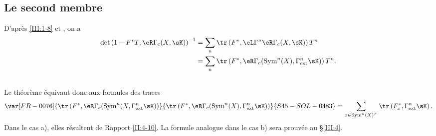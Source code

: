 \subsection{Le second membre}\label{III:2-12}

D'après \ref{III:1-8} et , on a 
\begin{align*}
  \det\left(1-F^* T,\eR\Gamma_c(X,\sK)\right)^{-1} 
    &= \sum_n \tr\left(F^*,\eL\Gamma^n\eR\Gamma_c(X,\sK)\right) T^n \\
    &= \sum_n \tr\left(F^*,\eR\Gamma_c(\operatorname{Sym}^n(X),\Gamma_\text{ext}^n\sK)\right) T^n \text{.}
\end{align*}





\subsection{}\label{III:2-13}

Le théorème équivaut donc aux formules des traces 
\[
  \var[FR-0076]{\tr\left(F^*,\eR\Gamma_c(\operatorname{Sym}^n(X,\Gamma_\text{ext}^n \sK)\right)}{\tr\left(F^*,\eR\Gamma_c(\operatorname{Sym}^n(X),\Gamma_\text{ext}^n \sK)\right)}{S45-SOL-0483} = \sum_{x\in\operatorname{Sym}^n(X)^F} \tr\left(F_x^*,\Gamma_\text{ext}^n\sK\right) \text{.}
\]
Dans le cas a), elles résultent de Rapport \ref{II:4-10}. La formule 
analogue dans le cas b) sera prouvée au \S\ref{III:4}. 










\section{}\label{III:3}





\subsection{}\label{III:3-1}

